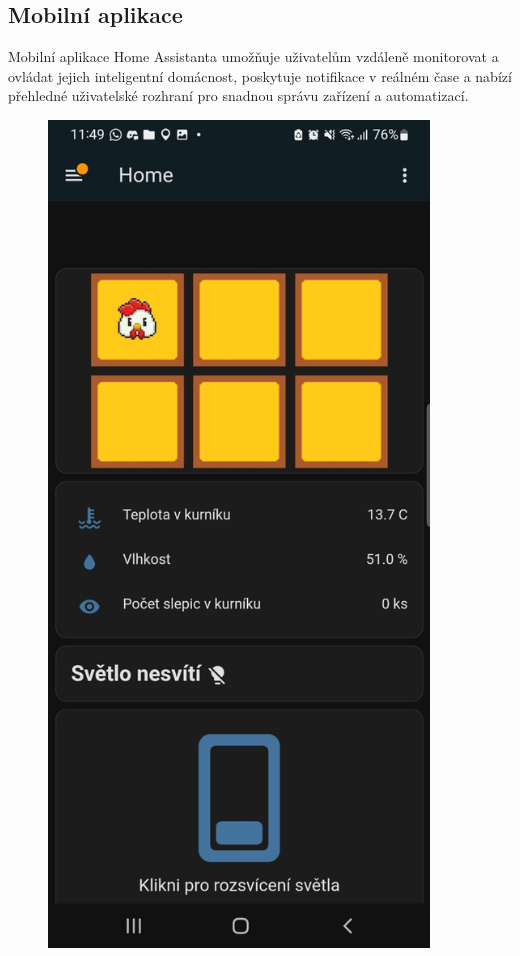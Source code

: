 \subsection*{Mobilní aplikace}
Mobilní aplikace Home Assistanta umožňuje uživatelům vzdáleně monitorovat a ovládat jejich inteligentní domácnost, poskytuje notifikace v reálném čase a nabízí přehledné uživatelské rozhraní pro snadnou správu zařízení a automatizací.

\begin{figure}[H]
    \centering
    \begin{minipage}[t]{0.5\textwidth}
        \centering
        \includegraphics[width=0.9\textwidth]{img/mobilni_apka1}

\end{minipage}
\end{figure}
